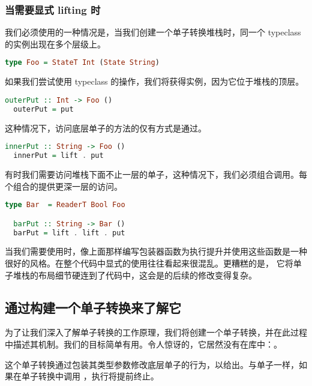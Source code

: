 \documentclass[./main.tex]{subfiles}
\begin{document}
\subsubsection*{当需要显式 lifting 时}

我们必须使用的一种情况是，当我们创建一个单子转换堆栈时，同一个 typeclass 的实例出现在多个层级上。

\begin{lstlisting}[language=Haskell]
  type Foo = StateT Int (State String)
\end{lstlisting}

如果我们尝试使用 typeclass 的操作，我们将获得实例，因为它位于堆栈的顶层。

\begin{lstlisting}[language=Haskell]
  outerPut :: Int -> Foo ()
  outerPut = put
\end{lstlisting}

这种情况下，访问底层单子的方法的仅有方式是通过。

\begin{lstlisting}[language=Haskell]
  innerPut :: String -> Foo ()
  innerPut = lift . put
\end{lstlisting}

有时我们需要访问堆栈下面不止一层的单子，这种情况下，我们必须组合调用。每个组合的提供更深一层的访问。

\begin{lstlisting}[language=Haskell]
  type Bar  = ReaderT Bool Foo

  barPut :: String -> Bar ()
  barPut = lift . lift . put
\end{lstlisting}

当我们需要使用时，像上面那样编写包装器函数为执行提升并使用这些函数是一种很好的风格。在整个代码中显式的使用往往看起来很混乱。更糟糕的是，
它将单子堆栈的布局细节硬连到了代码中，这会是的后续的修改变得复杂。

\subsection*{通过构建一个单子转换来了解它}

为了让我们深入了解单子转换的工作原理，我们将创建一个单子转换，并在此过程中描述其机制。我们的目标简单有用。令人惊讶的，它居然没有在库中：。

这个单子转换通过包装其类型参数修改底层单子的行为，以给出。与单子一样，如果在单子转换中调用
，执行将提前终止。
\end{document}
